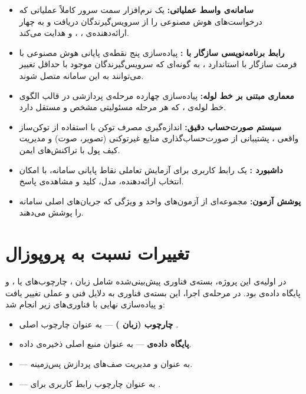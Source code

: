 \begin{itemize}
  \item \textbf{سامانه‌ی واسط عملیاتی:} یک نرم‌افزار سمت سرور کاملاً
    عملیاتی که درخواست‌های هوش مصنوعی را از سرویس‌گیرندگان دریافت و به
    چهار ارائه‌دهنده‌ی ، ،  و
     هدایت می‌کند.

  \item \textbf{رابط برنامه‌نویسی سازگار با :}
    پیاده‌سازی پنج نقطه‌ی پایانی هوش مصنوعی با فرمت سازگار با استاندارد
    ، به گونه‌ای که سرویس‌گیرندگان موجود با حداقل تغییر
    می‌توانند به این سامانه متصل شوند.

  \item \textbf{معماری مبتنی بر خط لوله:}
    پیاده‌سازی چهارده مرحله‌ی پردازشی در قالب الگوی خط لوله‌ی ،
    که هر مرحله مسئولیتی مشخص و مستقل دارد.

  \item \textbf{سیستم صورت‌حساب دقیق:}
    اندازه‌گیری مصرف توکن با استفاده از توکن‌ساز واقعی ، پشتیبانی
    از صورت‌حساب‌گذاری منابع غیرتوکنی (تصویر، صوت) و مدیریت کیف پول با
    تراکنش‌های ایمن.

  \item \textbf{داشبورد :}
    یک رابط کاربری  برای آزمایش تعاملی نقاط پایانی سامانه، با
    امکان انتخاب ارائه‌دهنده، مدل، کلید  و مشاهده‌ی پاسخ.

  \item \textbf{پوشش آزمون:}
    مجموعه‌ای از آزمون‌های واحد و ویژگی که جریان‌های اصلی سامانه را
    پوشش می‌دهند.
\end{itemize}

\section{تغییرات نسبت به پروپوزال}
\label{sec:changes}

در  اولیه‌ی این پروژه، بسته‌ی فناوری پیش‌بینی‌شده
شامل زبان ، چارچوب‌های  یا ، و پایگاه داده‌ی
 بود. در مرحله‌ی اجرا، این بسته‌ی فناوری به دلایل فنی و
عملی تغییر یافت و پیاده‌سازی نهایی با فناوری‌های زیر انجام شد:

\begin{itemize}
  \item \textbf{چارچوب  (زبان )} — به عنوان چارچوب
    اصلی .
  \item \textbf{پایگاه داده‌ی } — به عنوان منبع اصلی ذخیره‌ی
    داده.
  \item \textbf{} — به عنوان  و
    مدیریت صف‌های پردازش پس‌زمینه.
  \item \textbf{} — به عنوان چارچوب رابط کاربری برای
    .
\end{itemize}

